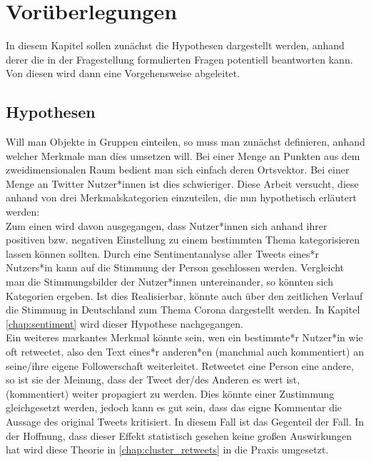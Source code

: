 \chapter{Vorüberlegungen}
\label{chap:voruberlegungen}
In diesem Kapitel sollen zunächst die Hypothesen dargestellt werden, anhand  derer die in der Fragestellung formulierten Fragen potentiell beantworten kann. Von diesen wird dann eine Vorgehensweise abgeleitet.
\section{Hypothesen}
\label{sec:hypothesen}
Will man Objekte in Gruppen einteilen, so muss man zunächst definieren, anhand welcher Merkmale man dies umsetzen will. Bei einer Menge an Punkten aus dem zweidimensionalen Raum bedient man sich einfach deren Ortsvektor. Bei einer Menge an Twitter Nutzer*innen  ist dies schwieriger. Diese Arbeit versucht, diese anhand von drei Merkmalskategorien einzuteilen, die nun hypothetisch erläutert werden: \\ \newline
Zum einen wird davon ausgegangen, dass Nutzer*innen sich anhand ihrer positiven bzw. negativen Einstellung zu einem bestimmten Thema kategorisieren lassen können sollten. Durch eine Sentimentanalyse aller Tweets eines*r Nutzers*in kann auf die Stimmung der Person geschlossen werden. Vergleicht man die Stimmungsbilder der Nutzer*innen untereinander, so könnten sich Kategorien ergeben. Ist dies Realisierbar, könnte auch über den zeitlichen Verlauf die Stimmung in Deutschland zum Thema Corona dargestellt werden. In Kapitel \ref{chap:sentiment} wird dieser Hypothese nachgegangen. \\ \newline
Ein weiteres markantes Merkmal könnte sein, wen ein bestimmte*r Nutzer*in wie oft retweetet, also den Text eines*r anderen*en  (manchmal auch kommentiert) an seine/ihre eigene Followerschaft weiterleitet. Retweetet eine Person eine andere, so ist sie der Meinung, dass der Tweet der/des Anderen es wert ist, (kommentiert) weiter propagiert zu werden. Dies könnte einer Zustimmung gleichgesetzt werden, jedoch kann es gut sein, dass das eigne Kommentar die Aussage des original Tweets kritisiert. In diesem Fall ist das Gegenteil der Fall. In der Hoffnung, dass dieser Effekt statistisch gesehen keine großen Auswirkungen hat wird diese Theorie in \ref{chap:cluster_retweets} in die Praxis umgesetzt. \\ \newline
